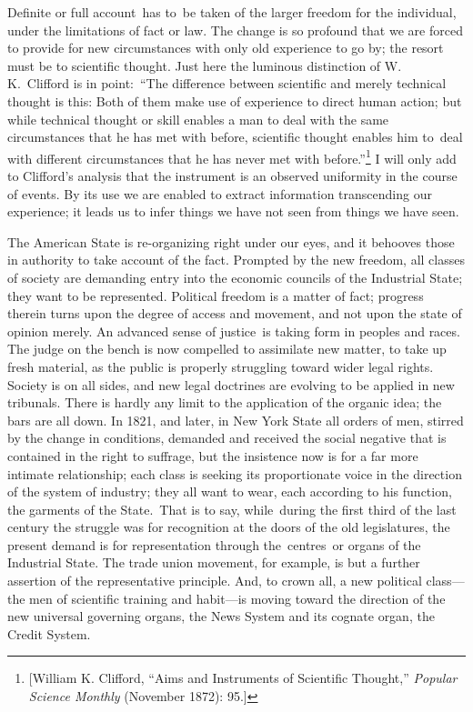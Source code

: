 \documentclass[twoside,symmetric,nobib,justified]{tufte-book}
\begin{document}
Definite or full account~has to~be taken of the larger freedom for the
individual, under the limitations of fact or law. The change is so
profound that we are forced to provide for new circumstances with only
old experience to go by; the resort must be to scientific thought. Just
here the luminous distinction of W. K.~Clifford is in point:~``The
difference between scientific and merely technical thought is this: Both
of them make use of experience to direct human action; but while
technical thought or skill enables a man to deal with the same
circumstances that he has met with before, scientific thought enables
him to~deal with different circumstances that he has never met with
before.''\footnote{{[}William K. Clifford, ``Aims and Instruments of
  Scientific Thought,'' \emph{Popular Science Monthly} (November 1872):
  95.{]}} I will only add to Clifford's analysis that the instrument is
an observed uniformity in the course of events. By its use we are
enabled to extract information transcending our experience; it leads us
to infer things we have not seen from things we have seen.~

The American State is re-organizing right under our eyes, and it
behooves those in authority to take account of the fact. Prompted by the
new freedom, all classes of society are demanding entry into the
economic councils of the Industrial State; they want to be represented.
Political freedom is a matter of fact; progress therein turns upon the
degree of access and movement, and not upon the state of opinion merely.
An advanced sense of justice~is taking form in peoples and races. The
judge on the bench is now compelled to assimilate new matter, to take up
fresh material, as the public is properly struggling toward wider legal
rights. Society is on all sides, and new legal doctrines are evolving to
be applied in new tribunals. There is hardly any limit to the
application of the organic idea; the bars are all down. In 1821, and
later, in New York State all orders of men, stirred by the change in
conditions, demanded and received the social negative that is contained
in the right to suffrage, but the insistence now is for a far more
intimate relationship; each class is seeking its proportionate voice in
the direction of the system of industry; they all want to wear, each
according to his function, the garments of the State.~That is to say,
while~during the first third of the last century the struggle was for
recognition at the doors of the old legislatures, the present demand is
for representation through the~centres~or organs of the Industrial
State. The trade union movement, for example, is but a further assertion
of the representative principle. And, to crown all, a new political
class---the men of scientific training and habit---is moving toward the
direction of the new universal governing organs, the News System and its
cognate organ, the Credit System.~
\end{document}
